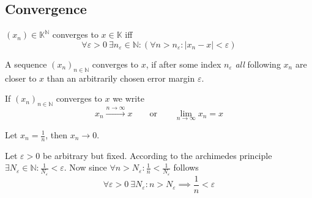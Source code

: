 \subsection{Convergence}
\begin{definition}\label{def:conv_seq}
   \((x_n) \in \mathbb{K}^\mathbb{N}\) converges to \(x \in \mathbb{K}\) iff
   \[\forall \varepsilon > 0~\exists n_\varepsilon \in \mathbb{N}: (\forall n > n_\varepsilon: |x_n - x| < \varepsilon)\]
\end{definition}
\begin{remark}[Intuition]
   A sequence \((x_n)_{n \in \mathbb{N}}\) converges to \(x\), if after some index \(n_\varepsilon\) \emph{all} following \(x_n\) are closer to \(x\) than an arbitrarily chosen error margin \(\varepsilon\).
\end{remark}
\begin{remark}[Notation]
   If \((x_n)_{n \in \mathbb{N}}\) converges to \(x\) we write
   \[x_n \xrightarrow{n \to \infty} x \qquad\text{or}\qquad \lim_{n \to \infty} x_n = x\]
\end{remark}
\begin{example}
   Let \(x_n = \frac{1}{n}\), then \(x_n \to 0\).

   Let \(\varepsilon > 0\) be arbitrary but fixed.
   According to the archimedes principle \(\exists N_\varepsilon \in \mathbb{N}: \frac{1}{N_\varepsilon} < \varepsilon\).
   Now since \(\forall n > N_\varepsilon: \frac{1}{n} < \frac{1}{N_\varepsilon}\) follows
   \[\forall \varepsilon > 0~\exists N_\varepsilon: n > N_\varepsilon \implies \frac{1}{n} < \varepsilon\]

   \begin{center}
      
   \end{center}
\end{example}


